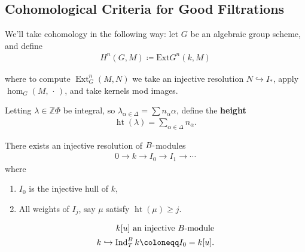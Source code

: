 \begin{center}
\end{center}

\hypertarget{cohomological-criteria-for-good-filtrations}{%
\subsection{Cohomological Criteria for Good
Filtrations}\label{cohomological-criteria-for-good-filtrations}}

We'll take cohomology in the following way: let \(G\) be an algebraic
group scheme, and define
\begin{align*}  
H^n(G, M) \coloneqq
\mathrm{Ext} G^n(k, M)
\end{align*}

where to compute \(\operatorname{Ext}_G^n(M, N)\) we take an injective
resolution \(N \hookrightarrow I_*\), apply \(\hom_G(M, {\,\cdot\,})\),
and take kernels mod images.

Letting \(\lambda \in {\mathbb{Z}}\Phi\) be integral, so
\(\lambda_{\alpha \in \Delta} = \sum n_\alpha \alpha\), define the
\textbf{height}
\begin{align*}  
\operatorname{ht}(\lambda) = \sum_{\alpha\in\Delta} n_\alpha
.\end{align*}

\begin{lemma}[?]

There exists an injective resolution of \(B{\hbox{-}}\)modules
\begin{align*}  
0\to k\to I_0 \to I_1 \to \cdots
\end{align*}
where

\begin{enumerate}
\def\labelenumi{\arabic{enumi}.}
\tightlist
\item
  \(I_0\) is the injective hull of \(k\),
\item
  All weights of \(I_j\), say \(\mu\) satisfy
  \(\operatorname{ht}(\mu) \geq j\).
\end{enumerate}

\end{lemma}

\begin{align*}  
k[u] \text{ an injective $B{\hbox{-}}$module} \\
k\hookrightarrow\operatorname{Ind}_T^B k \coloneqq I_0 = k[u]
.\end{align*}

